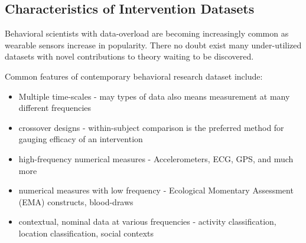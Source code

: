 
\subsection{Characteristics of Intervention Datasets}

Behavioral scientists with data-overload are becoming increasingly common as wearable sensors increase in popularity.
There no doubt exist many under-utilized datasets with novel contributions to theory waiting to be discovered.

Common features of contemporary behavioral research dataset include:

\begin{itemize}
	\item{Multiple time-scales - may types of data also means measurement at many different frequencies}
	\item{crossover designs - within-subject comparison is the preferred method for gauging efficacy of an intervention}
	\item{high-frequency numerical measures - Accelerometers, ECG, GPS, and much more}
	\item{numerical measures with low frequency - Ecological Momentary Assessment (EMA) constructs, blood-draws}
	\item{contextual, nominal data at various frequencies - activity classification, location classification, social contexts}
\end{itemize}


